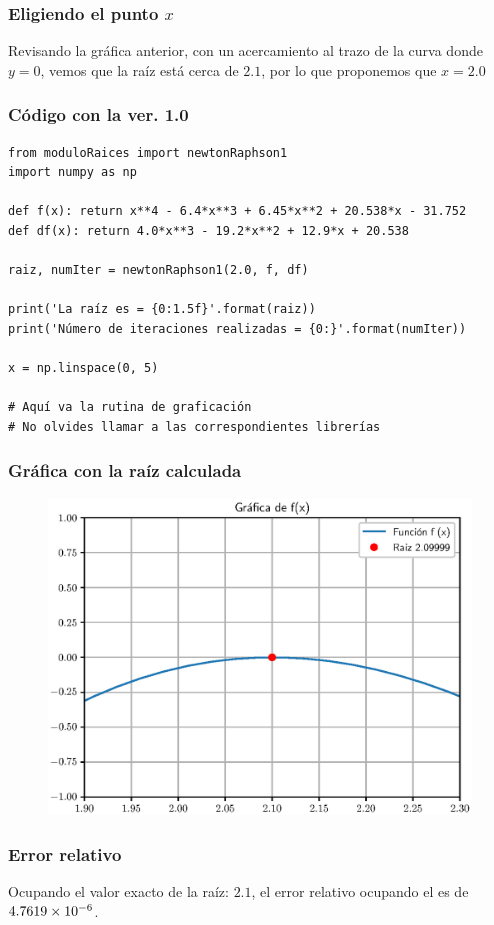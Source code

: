 \documentclass[12pt]{beamer}
\begin{document}
\begin{frame}
\frametitle{Eligiendo el punto $x$}
Revisando la gráfica anterior, con un acercamiento al trazo de la curva donde $y = 0$, \pause vemos que la raíz está cerca de $2.1$, \pause por lo que proponemos que $x = 2.0$
\end{frame}
\begin{frame}
\frametitle{Código con la ver. 1.0}
\begin{lstlisting}[caption=Código para resolver el ejercicio 1]
from moduloRaices import newtonRaphson1
import numpy as np

def f(x): return x**4 - 6.4*x**3 + 6.45*x**2 + 20.538*x - 31.752
def df(x): return 4.0*x**3 - 19.2*x**2 + 12.9*x + 20.538

raiz, numIter = newtonRaphson1(2.0, f, df)

print('La raíz es = {0:1.5f}'.format(raiz))
print('Número de iteraciones realizadas = {0:}'.format(numIter))

x = np.linspace(0, 5)

# Aquí va la rutina de graficación
# No olvides llamar a las correspondientes librerías
\end{lstlisting}
\end{frame}
\begin{frame}
\frametitle{Gráfica con la raíz calculada}
\begin{figure}
    \centering
    \includegraphics[scale=0.55]{Imagenes/raices_03_MNR_02.eps}
\end{figure}
\end{frame}
\begin{frame}
\frametitle{Error relativo}
Ocupando el valor exacto de la raíz: $2.1$, el error relativo ocupando el  es de $\num{4.7619d-6}$.
\end{frame}
\end{document}
